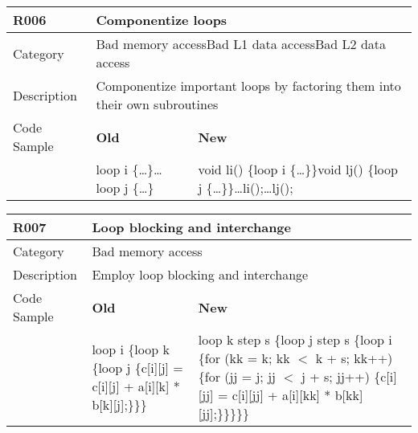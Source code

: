 \begin{tabular}{|p{0.9in}|p{2.0in}|p{2.0in}|} \hline
\textbf{R006}       & \multicolumn{2}{|p{4.0in}|}{\textbf{Componentize loops}} \\ \hline
Category            & \multicolumn{2}{|p{4.0in}|}{Bad memory access\newline Bad L1 data access\newline Bad L2 data access} \\ \hline
Description         & \multicolumn{2}{|p{4.0in}|}{Componentize important loops by factoring them into their own subroutines} \\ \hline
Code Sample         & \textbf{Old} & \textbf{New} \\ \hline
                    & loop i \{\ldots\}\newline \ldots\newline loop j \{\ldots\}
                    & void li() \{loop i \{\ldots\}\}\newline void lj() \{loop j \{\ldots\}\}\newline \ldots\newline li();\newline \ldots\newline lj(); \\ \hline
\end{tabular}

\begin{tabular}{|p{0.9in}|p{2.0in}|p{2.0in}|} \hline
\textbf{R007}       & \multicolumn{2}{|p{4.0in}|}{\textbf{Loop blocking and interchange}} \\ \hline
Category            & \multicolumn{2}{|p{4.0in}|}{Bad memory access} \\ \hline
Description         & \multicolumn{2}{|p{4.0in}|}{Employ loop blocking and interchange} \\ \hline
Code Sample         & \textbf{Old} & \textbf{New} \\ \hline
                    & loop i \{\newline   loop k \{\newline     loop j \{\newline       c[i][j] = c[i][j] + a[i][k] * b[k][j];\newline     \}\newline   \}\newline \}
                    & loop k step s \{\newline   loop j step s \{\newline     loop i \{\newline       for (kk = k; kk $<$ k + s; kk++) \{\newline         for (jj = j; jj $<$ j + s; jj++) \{\newline           c[i][jj] = c[i][jj] + a[i][kk] * b[kk][jj];\newline         \}\newline       \}\newline     \}\newline   \}\newline \} \\ \hline
\end{tabular}


